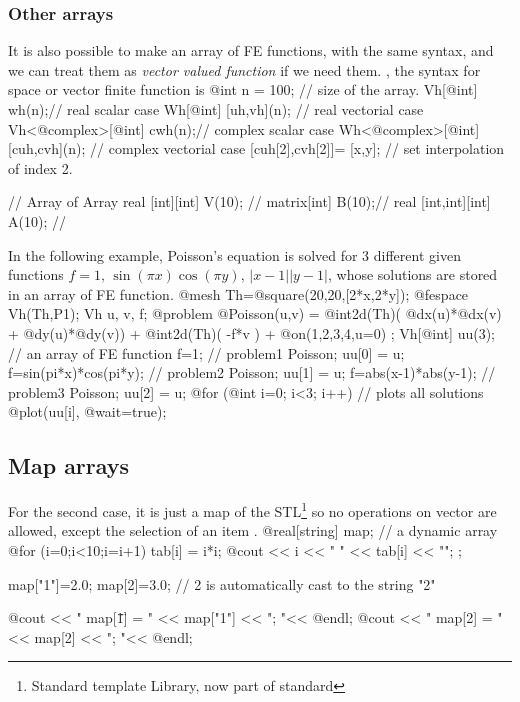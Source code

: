 \documentclass[a4paper,twoside,12pt]{book}
\def\n{\nabla}
\begin{document}
\subsubsection{Other arrays}

It is also possible to make an array of FE functions, with the same syntax,
and we can treat them as \emph{vector valued function} if we need them.
, the syntax for space or vector finite function is
\bFF
@int n = 100; // size of the array. 
Vh[@int] wh(n);// real scalar case 
Wh[@int] [uh,vh](n); // real vectorial case 
Vh<@complex>[@int] cwh(n);// complex scalar  case
Wh<@complex>[@int] [cuh,cvh](n); // complex vectorial case 
[cuh[2],cvh[2]]= [x,y]; // set interpolation of index 2.  

// Array of Array 
real [int][int] V(10); // 
matrix[int] B(10);// 
real [int,int][int] A(10); //

\eFF
\begin{example}
In the following example, Poisson's equation is solved for 3 different given
functions $f=1,\, \sin(\pi x)\cos(\pi y),\, |x-1||y-1|$, whose solutions are
stored in an array of FE function.
\bFF
@mesh Th=@square(20,20,[2*x,2*y]);
@fespace Vh(Th,P1);
Vh u, v, f;
@problem @Poisson(u,v) =
    @int2d(Th)( @dx(u)*@dx(v) + @dy(u)*@dy(v))
     + @int2d(Th)( -f*v ) + @on(1,2,3,4,u=0) ;
Vh[@int] uu(3); // an array of FE function
f=1;   // problem1
Poisson; uu[0] = u;
f=sin(pi*x)*cos(pi*y);  // problem2
Poisson; uu[1] = u;
f=abs(x-1)*abs(y-1);    // problem3
Poisson; uu[2] = u;
@for (@int i=0; i<3; i++)  // plots all solutions
  @plot(uu[i], @wait=true);
\eFF
\end{example}

\subsection{Map arrays}
For the second case, it is just
a map of the STL\footnote{Standard template Library, now part of standard \Cpp}\cite{cpp}
so no  operations on vector are allowed,   except the
selection of an item  . 
\bFF
@real[string] map;        //  a dynamic array
@for (i=0;i<10;i=i+1)
  {
    tab[i] = i*i;
    @cout << i << " " << tab[i] << "\n";
  };

map["1"]=2.0;
map[2]=3.0;             //  2 is automatically cast to the string "2"

@cout << " map[\"1\"] = " << map["1"] << "; "<< @endl;
@cout << " map[2] = " << map[2] << "; "<< @endl;
\end{document}
